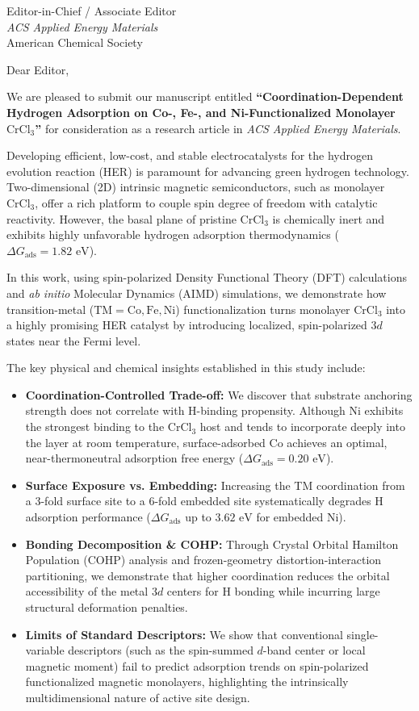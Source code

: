 \documentclass[11pt,a4paper]{letter}
\date{August 11, 2026}
\begin{document}
\begin{letter}{
    Editor-in-Chief / Associate Editor\\
    \textit{ACS Applied Energy Materials}\\
    American Chemical Society
}

\opening{Dear Editor,}

We are pleased to submit our manuscript entitled \textbf{``Coordination-Dependent Hydrogen Adsorption on Co-, Fe-, and Ni-Functionalized Monolayer $\text{CrCl}_3$''} for consideration as a research article in \textit{ACS Applied Energy Materials}.

Developing efficient, low-cost, and stable electrocatalysts for the hydrogen evolution reaction (HER) is paramount for advancing green hydrogen technology. Two-dimensional (2D) intrinsic magnetic semiconductors, such as monolayer $\text{CrCl}_3$, offer a rich platform to couple spin degree of freedom with catalytic reactivity. However, the basal plane of pristine $\text{CrCl}_3$ is chemically inert and exhibits highly unfavorable hydrogen adsorption thermodynamics ($\Delta G_{\text{ads}} = 1.82\text{ eV}$).

In this work, using spin-polarized Density Functional Theory (DFT) calculations and \textit{ab initio} Molecular Dynamics (AIMD) simulations, we demonstrate how transition-metal ($\text{TM} = \text{Co}, \text{Fe}, \text{Ni}$) functionalization turns monolayer $\text{CrCl}_3$ into a highly promising HER catalyst by introducing localized, spin-polarized $3d$ states near the Fermi level. 

The key physical and chemical insights established in this study include:
\begin{itemize}
    \item \textbf{Coordination-Controlled Trade-off:} We discover that substrate anchoring strength does not correlate with H-binding propensity. Although Ni exhibits the strongest binding to the $\text{CrCl}_3$ host and tends to incorporate deeply into the layer at room temperature, surface-adsorbed Co achieves an optimal, near-thermoneutral adsorption free energy ($\Delta G_{\text{ads}} = 0.20\text{ eV}$).
    \item \textbf{Surface Exposure vs. Embedding:} Increasing the TM coordination from a 3-fold surface site to a 6-fold embedded site systematically degrades H adsorption performance ($\Delta G_{\text{ads}}$ up to $3.62\text{ eV}$ for embedded Ni).
    \item \textbf{Bonding Decomposition \& COHP:} Through Crystal Orbital Hamilton Population (COHP) analysis and frozen-geometry distortion-interaction partitioning, we demonstrate that higher coordination reduces the orbital accessibility of the metal $3d$ centers for H bonding while incurring large structural deformation penalties.
    \item \textbf{Limits of Standard Descriptors:} We show that conventional single-variable descriptors (such as the spin-summed $d$-band center or local magnetic moment) fail to predict adsorption trends on spin-polarized functionalized magnetic monolayers, highlighting the intrinsically multidimensional nature of active site design.
\end{itemize}


\end{letter}
\end{document}

